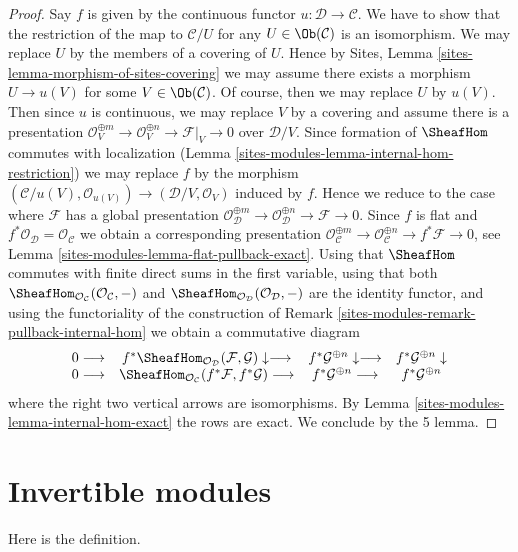 \begin{proof}
Say $f$ is given by the continuous functor $u : \mathcal{D} \to \mathcal{C}$.
We have to show that the restriction of the map to $\mathcal{C}/U$
for any $U \in \Ob(\mathcal{C})$ is an isomorphism.
We may replace $U$ by the members of a covering of $U$.
Hence by Sites, Lemma \ref{sites-lemma-morphism-of-sites-covering}
we may assume there exists a morphism $U \to u(V)$ for some
$V \in \Ob(\mathcal{C})$. Of course, then we may replace $U$ by $u(V)$.
Then since $u$ is continuous, we may replace $V$ by a covering
and assume there is a presentation
$\mathcal{O}_V^{\oplus m} \to \mathcal{O}_V^{\oplus n} \to
\mathcal{F}|_V \to 0$
over $\mathcal{D}/V$. Since formation of $\SheafHom$
commutes with localization (Lemma \ref{sites-modules-lemma-internal-hom-restriction})
we may replace $f$ by the morphism
$(\mathcal{C}/u(V), \mathcal{O}_{u(V)}) \to
(\mathcal{D}/V, \mathcal{O}_V)$ induced by $f$.
Hence we reduce to the case where $\mathcal{F}$ has a global
presentation
$\mathcal{O}_\mathcal{D}^{\oplus m} \to \mathcal{O}_\mathcal{D}^{\oplus n} \to
\mathcal{F} \to 0$.
Since $f$ is flat and $f^*\mathcal{O}_\mathcal{D} = \mathcal{O}_\mathcal{C}$
we obtain a corresponding presentation
$\mathcal{O}_\mathcal{C}^{\oplus m} \to \mathcal{O}_\mathcal{C}^{\oplus n} \to
f^*\mathcal{F} \to 0$, see
Lemma \ref{sites-modules-lemma-flat-pullback-exact}.
Using that $\SheafHom$ commutes with finite direct sums in the
first variable, using that both
$\SheafHom_{\mathcal{O}_\mathcal{C}}(\mathcal{O}_\mathcal{C}, -)$ and
$\SheafHom_{\mathcal{O}_\mathcal{D}}(\mathcal{O}_\mathcal{D}, -)$
are the identity functor, and using the
functoriality of the construction of
Remark \ref{sites-modules-remark-pullback-internal-hom}
we obtain a commutative diagram
$$
\begin{array}{cccc}0 \longrightarrow & f^*\SheafHom_{\mathcal{O}_\mathcal{D}}(\mathcal{F}, \mathcal{G})
\downarrow\longrightarrow & f^*\mathcal{G}^{\oplus n} \downarrow\longrightarrow & f^*\mathcal{G}^{\oplus n} \downarrow \\ 0 \longrightarrow & \SheafHom_{\mathcal{O}_\mathcal{C}}(f^*\mathcal{F}, f^*\mathcal{G})
\longrightarrow & f^*\mathcal{G}^{\oplus n} \longrightarrow & f^*\mathcal{G}^{\oplus n}\end{array}
$$
where the right two vertical arrows are isomorphisms.
By Lemma \ref{sites-modules-lemma-internal-hom-exact} the rows are exact.
We conclude by the 5 lemma.
\end{proof}

\section{Invertible modules}
\label{sites-modules-section-invertible}
Here is the definition.

